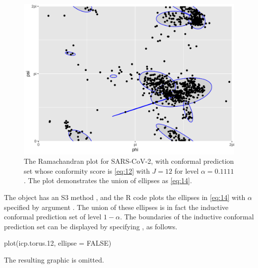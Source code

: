 \begin{figure}
     \centering
     \includegraphics[scale = 0.15]{Ellipses.png}
     \caption{The Ramachandran plot for SARS-CoV-2, with conformal prediction set whose conformity score is \eqref{eq:12} with $J = 12$ for level $\alpha = 0.1111$. The plot demonstrates the union of ellipses as \eqref{eq:14}.}
     \label{fig:ellipse}
\end{figure}

 The  object has an S3 method , and the R code  plots the ellipses in \eqref{eq:14} with $\alpha$ specified by argument . The union of these ellipses is in fact the inductive conformal prediction set of level $1-\alpha$. The boundaries of the inductive conformal prediction set can be displayed by specifying , as follows. 
 \begin{example}
plot(icp.torus.12, ellipse = FALSE)
 \end{example}

The resulting graphic is omitted. 
%
%

%
 

